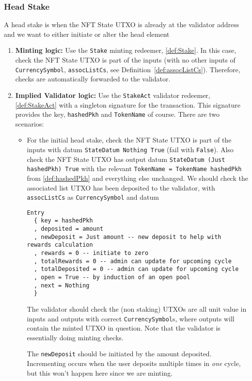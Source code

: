 \documentclass[10pt, a4paper]{article}
\theoremstyle{definition}
\begin{document}
\subsubsection{Head Stake}\label{subsubsection:HeadStake}
A head stake is when the NFT State UTXO is already at the validator address and we want to either initiate or alter the head element
\begin{enumerate}
\item{\textbf{Minting logic:} Use the \texttt{Stake} minting redeemer, \ref{def:Stake}. In this case, check the NFT State UTXO is part of the inputs (with no other inputs of \texttt{CurrencySymbol}, \texttt{assocListCs}, see Definition~\ref{def:assocListCs}). Therefore, checks are automatically forwarded to the validator.}
\item{\textbf{Implied Validator logic:} Use the \texttt{StakeAct} validator redeemer, \ref{def:StakeAct} with a singleton signature for the transaction. This signature provides the key, \texttt{hashedPkh} and \texttt{TokenName} of course. There are two scenarios:

\begin{itemize}
\item{For the initial head stake, check the NFT State UTXO is part of the inputs with datum \texttt{StateDatum Nothing True} (fail with \texttt{False}). Also check the NFT State UTXO has output datum \texttt{StateDatum (Just hashedPkh) True} with the relevant \texttt{TokenName = TokenName hashedPkh} from \ref{def:hashedPkh} and everything else unchanged. We should check the associated list UTXO has been deposited to the validator, with \texttt{assocListCs} as \texttt{CurrencySymbol} and datum
\begin{verbatim}
Entry
  { key = hashedPkh
  , deposited = amount
  , newDeposit = Just amount -- new deposit to help with rewards calculation
  , rewards = 0 -- initiate to zero
  , totalRewards = 0 -- admin can update for upcoming cycle
  , totalDeposited = 0 -- admin can update for upcoming cycle
  , open = True -- by induction of an open pool
  , next = Nothing
  }
\end{verbatim}
The validator should check the (non staking) UTXOs are all unit value in inputs and outputs with correct \texttt{CurrencySymbol}s, where outputs will contain the minted UTXO in question. Note that the validator is essentially doing minting checks.

The \texttt{newDeposit} should be initiated by the amount deposited. Incrementing occurs when the user deposits multiple times in \textit{one} cycle, but this won't happen here since we are minting.

}
\end{itemize}}
\end{enumerate}
\end{document}
